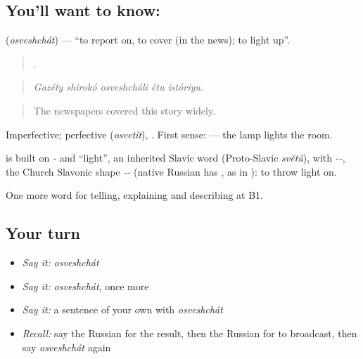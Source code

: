 \subsection*{You'll want to know: }
\textbf{} (\emph{osveshchát}) — \textquotedblleft{}to report on, to cover (in the news); to light up\textquotedblright{}.

\begin{quote}
    .
\end{quote}

\begin{quote}
\emph{Gazéty shirokó osveshcháli étu istóriyu.}
\end{quote}

\begin{quote}
The newspapers covered this story widely.
\end{quote}

Imperfective; perfective \emph{} (\emph{osvetít}), \emph{ }. First sense: \emph{  } — the lamp lights the room.

\begin{cousinweb}
\emph{} is built on \emph{-} and \emph{} \textquotedblleft{}light\textquotedblright{}, an inherited Slavic word (Proto-Slavic \emph{světŭ}), with \emph{--}, the Church Slavonic shape \emph{--} (native Russian has \emph{}, as in \emph{}): to throw light on.
\end{cousinweb}

\begin{grammarlens}[title={What you've built}]
One more word for telling, explaining and describing at B1.
\end{grammarlens}

\subsection*{Your turn}
\begin{itemize}
\raggedright
  \item \emph{Say it:} \emph{osveshchát}
  \item \emph{Say it:} \emph{osveshchát}, once more
  \item \emph{Say it:} a sentence of your own with \emph{osveshchát}
  \item \emph{Recall:} say the Russian for the result, then the Russian for to broadcast, then say \emph{osveshchát} again
\end{itemize}

